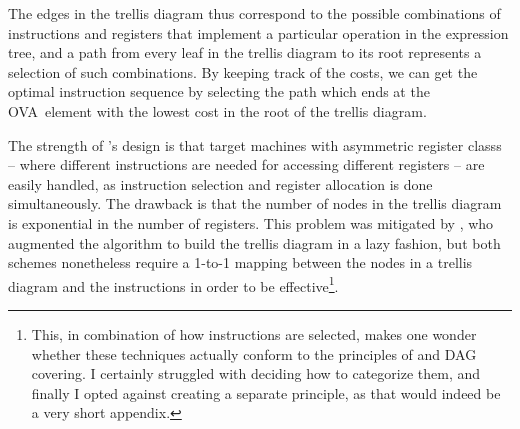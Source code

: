 {%
%        
%

The \glspl{edge} in the \gls{trellis diagram} thus correspond to the possible
combinations of \glspl{instruction} and \glspl{register} that implement a
particular operation in the \gls{expression tree}, and a path from every \gls{leaf}
in the \gls{trellis diagram} to its \gls{root} represents a selection of such
combinations.
%
By keeping track of the costs, we can get the optimal \gls{instruction} sequence
by selecting the path which ends at the \gls{OVA}~element with the lowest cost
in the \gls{root} of the \gls{trellis diagram}.

The strength of \citeauthor{Wess1992}'s design is that \glspl{target machine}
with asymmetric \glspl{register class} -- where different \glspl{instruction}
are needed for accessing different \glspl{register} -- are easily handled, as
\gls{instruction selection} and \gls{register allocation} is done
simultaneously.
%
The drawback is that the number of \glspl{node} in the
\gls{trellis diagram} is exponential in the number of \glspl{register}.
%
This
problem was mitigated by \textcite{Frohlich1999}, who augmented the algorithm to
build the \gls{trellis diagram} in a lazy fashion, but both schemes nonetheless
require a \mbox{1-to-1} mapping between the \glspl{node} in a \gls{trellis
  diagram} and the \glspl{instruction} in order to be effective\footnote{This,
  in combination of how \glspl{instruction} are selected, makes one wonder
  whether these techniques actually conform to the \glspl{principle} of
   and \gls{DAG covering}.
%
I certainly struggled with deciding how to categorize them, and finally I opted
against creating a separate \gls{principle}, as that would indeed be a very
short appendix.}.


}
